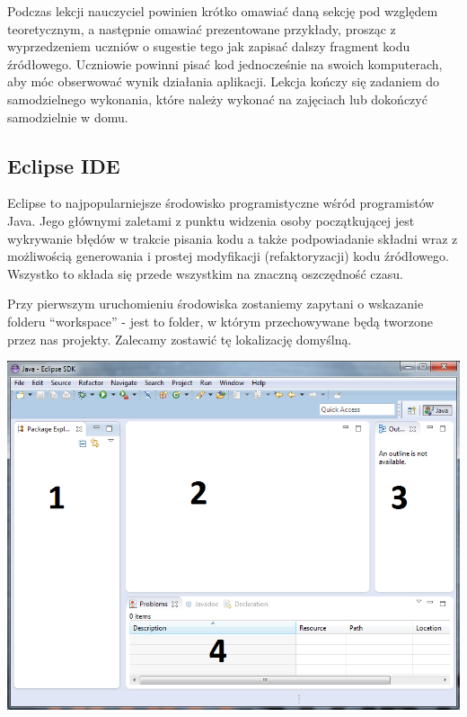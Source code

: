 \documentclass[letterpaper,10pt,english]{sphinxmanual}
\begin{document}
Podczas lekcji nauczyciel powinien krótko omawiać daną sekcję pod względem teoretycznym, a następnie omawiać prezentowane przykłady, prosząc z wyprzedzeniem uczniów o sugestie tego jak zapisać dalszy fragment kodu źródłowego. Uczniowie powinni pisać kod jednocześnie na swoich komputerach, aby móc obserwować wynik działania aplikacji. Lekcja kończy się zadaniem do samodzielnego wykonania, które należy wykonać na zajęciach lub dokończyć samodzielnie w domu.


\subsection{Eclipse IDE}
\label{wprowadzenie:eclipse-ide}
Eclipse to najpopularniejsze środowisko programistyczne wśród programistów Java. Jego głównymi zaletami z punktu widzenia osoby początkującej jest wykrywanie błędów w trakcie pisania kodu a także podpowiadanie składni wraz z możliwością generowania i prostej modyfikacji (refaktoryzacji) kodu źródłowego. Wszystko to składa się przede wszystkim na znaczną oszczędność czasu.

Przy pierwszym uruchomieniu środowiska zostaniemy zapytani o wskazanie folderu ``workspace'' - jest to folder, w którym przechowywane będą tworzone przez nas projekty. Zalecamy zostawić tę lokalizację domyślną.

{\hfill\includegraphics{eclipse_overview.png}\hfill}
\end{document}
